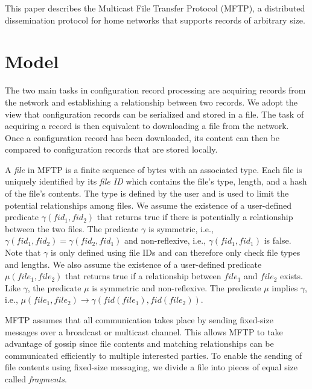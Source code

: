 \documentclass[letterpaper]{article}
\begin{document}
This paper describes the Multicast File Transfer Protocol (MFTP), a distributed dissemination protocol for home networks that supports records of arbitrary size.


\section{Model\label{model}}

The two main tasks in configuration record processing are acquiring records from the network and establishing a relationship between two records.
We adopt the view that configuration records can be serialized and stored in a file.
The task of acquiring a record is then equivalent to downloading a file from the network.
Once a configuration record has been downloaded, its content can then be compared to configuration records that are stored locally.

A \emph{file} in MFTP is a finite sequence of bytes with an associated type.
Each file is uniquely identified by its \emph{file ID} which contains the file's type, length, and a hash of the file's contents.
The type is defined by the user and is used to limit the potential relationships among files.
We assume the existence of a user-defined predicate $\gamma(fid_1, fid_2)$ that returns true if there is potentially a relationship between the two files.
The predicate $\gamma$ is symmetric, i.e., $\gamma(fid_1, fid_2) = \gamma(fid_2, fid_1)$ and non-reflexive, i.e., $\gamma(fid_1, fid_1)$ is false.
Note that $\gamma$ is only defined using file IDs and can therefore only check file types and lengths.
We also assume the existence of a user-defined predicate $\mu(file_1, file_2)$ that returns true if a relationship between $file_1$ and $file_2$ exists.
Like $\gamma$, the predicate $\mu$ is symmetric and non-reflexive.
The predicate $\mu$ implies $\gamma$, i.e., $\mu(file_1, file_2) \to \gamma(fid(file_1), fid(file_2))$.

MFTP assumes that all communication takes place by sending fixed-size messages over a broadcast or multicast channel.
This allows MFTP to take advantage of gossip since file contents and matching relationships can be communicated efficiently to multiple interested parties.
To enable the sending of file contents using fixed-size messaging, we divide a file into pieces of equal size called \emph{fragments}.
\end{document}
